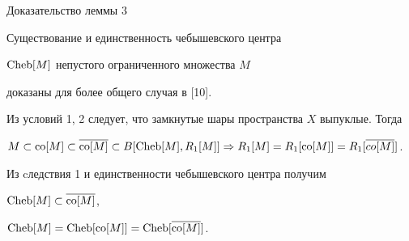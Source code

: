 \begin{pf*}{Доказательство леммы 3}


Существование и единственность чебышевского центра 


$\operatorname{Cheb}[M]$ непустого ограниченного множества $M$ 


доказаны для более общего случая в [10].


Из условий 1, 2 следует, что замкнутые шары пространства $X$ выпуклые. Тогда 


$M \subset\co[M] \subset \overline{\co[M]} \subset


B[\Cheb[M],R_{1}[M]] \Rightarrow 


R_{1}[M] = R_{1}[\co[M]] = R_{1}[ \overline{co[M]}]$. 


Из cледствия 1 и единственности чебышевского центра получим


$\operatorname{Cheb}[M] \subset \overline{\operatorname{co}[M]}$,


$\operatorname{Cheb}[M] = \operatorname{Cheb}[\operatorname{co}[M]] = \operatorname{Cheb}[\overline{\operatorname{co}[M]}]$.


\end{pf*}








